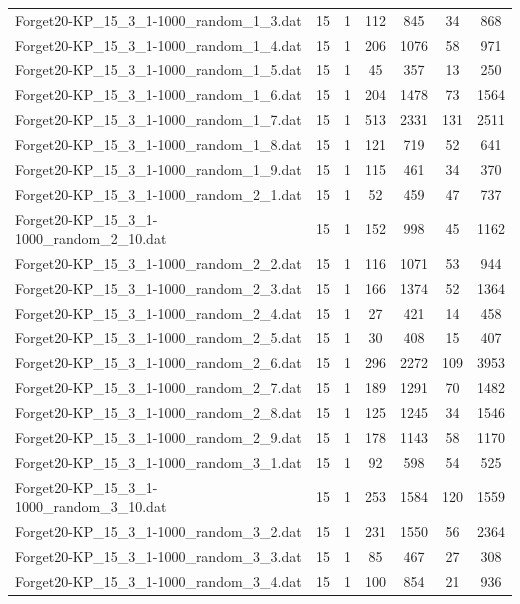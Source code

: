 \begin{table}[!ht]
\begin{tabular}{lcccccc}
Forget20-KP\_15\_3\_1-1000\_random\_1\_3.dat & 15 & 1 & 112 & 845 & 34 & 868 \\
Forget20-KP\_15\_3\_1-1000\_random\_1\_4.dat & 15 & 1 & 206 & 1076 & 58 & 971 \\
Forget20-KP\_15\_3\_1-1000\_random\_1\_5.dat & 15 & 1 & 45 & 357 & 13 & 250 \\
Forget20-KP\_15\_3\_1-1000\_random\_1\_6.dat & 15 & 1 & 204 & 1478 & 73 & 1564 \\
Forget20-KP\_15\_3\_1-1000\_random\_1\_7.dat & 15 & 1 & 513 & 2331 & 131 & 2511 \\
Forget20-KP\_15\_3\_1-1000\_random\_1\_8.dat & 15 & 1 & 121 & 719 & 52 & 641 \\
Forget20-KP\_15\_3\_1-1000\_random\_1\_9.dat & 15 & 1 & 115 & 461 & 34 & 370 \\
Forget20-KP\_15\_3\_1-1000\_random\_2\_1.dat & 15 & 1 & 52 & 459 & 47 & 737 \\
Forget20-KP\_15\_3\_1-1000\_random\_2\_10.dat & 15 & 1 & 152 & 998 & 45 & 1162 \\
Forget20-KP\_15\_3\_1-1000\_random\_2\_2.dat & 15 & 1 & 116 & 1071 & 53 & 944 \\
Forget20-KP\_15\_3\_1-1000\_random\_2\_3.dat & 15 & 1 & 166 & 1374 & 52 & 1364 \\
Forget20-KP\_15\_3\_1-1000\_random\_2\_4.dat & 15 & 1 & 27 & 421 & 14 & 458 \\
Forget20-KP\_15\_3\_1-1000\_random\_2\_5.dat & 15 & 1 & 30 & 408 & 15 & 407 \\
Forget20-KP\_15\_3\_1-1000\_random\_2\_6.dat & 15 & 1 & 296 & 2272 & 109 & 3953 \\
Forget20-KP\_15\_3\_1-1000\_random\_2\_7.dat & 15 & 1 & 189 & 1291 & 70 & 1482 \\
Forget20-KP\_15\_3\_1-1000\_random\_2\_8.dat & 15 & 1 & 125 & 1245 & 34 & 1546 \\
Forget20-KP\_15\_3\_1-1000\_random\_2\_9.dat & 15 & 1 & 178 & 1143 & 58 & 1170 \\
Forget20-KP\_15\_3\_1-1000\_random\_3\_1.dat & 15 & 1 & 92 & 598 & 54 & 525 \\
Forget20-KP\_15\_3\_1-1000\_random\_3\_10.dat & 15 & 1 & 253 & 1584 & 120 & 1559 \\
Forget20-KP\_15\_3\_1-1000\_random\_3\_2.dat & 15 & 1 & 231 & 1550 & 56 & 2364 \\
Forget20-KP\_15\_3\_1-1000\_random\_3\_3.dat & 15 & 1 & 85 & 467 & 27 & 308 \\
Forget20-KP\_15\_3\_1-1000\_random\_3\_4.dat & 15 & 1 & 100 & 854 & 21 & 936 \\

\end{tabular}
\end{table}

